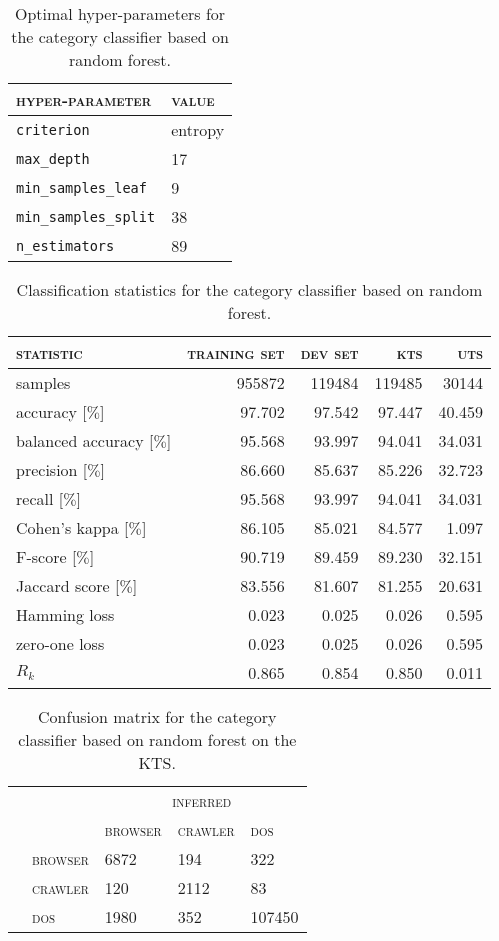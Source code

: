 \begin{table}[H]
	\centering
	\begin{tabular}{ll}
		\toprule
		\textsc{hyper-parameter} & \textsc{value}\\
		\midrule
		\verb|criterion| & entropy\\
		\verb|max_depth| & 17\\
		\verb|min_samples_leaf| & 9\\
		\verb|min_samples_split| & 38\\
		\verb|n_estimators| & 89\\
		\bottomrule
	\end{tabular}
	\caption{Optimal hyper-parameters for the category classifier based on random forest.}
	\label{tab:hyperparameters_category_random_forest}
\end{table}
\begin{table}[H]
	\centering
	\begin{tabular}{lrrrr}
		\toprule
		\textsc{statistic} & \textsc{training set} & \textsc{dev set} & \textsc{kts} & \textsc{uts}\\
		\midrule
		samples & 955872 & 119484 & 119485 & 30144\\
		accuracy [$\%$] & 97.702 & 97.542 & 97.447 & 40.459\\
		balanced accuracy [$\%$] & 95.568 & 93.997 & 94.041 & 34.031\\
		precision [$\%$] & 86.660 & 85.637 & 85.226 & 32.723\\
		recall [$\%$] & 95.568 & 93.997 & 94.041 & 34.031\\
		Cohen’s kappa [$\%$] & 86.105 & 85.021 & 84.577 & 1.097\\
		F-score [$\%$] & 90.719 & 89.459 & 89.230 & 32.151\\
		Jaccard score [$\%$] & 83.556 & 81.607 & 81.255 & 20.631\\
		Hamming loss & 0.023 & 0.025 & 0.026 & 0.595\\
		zero-one loss & 0.023 & 0.025 & 0.026 & 0.595\\
		$R_k$ & 0.865 & 0.854 & 0.850 & 0.011\\
		\bottomrule
	\end{tabular}
	\caption{Classification statistics for the category classifier based on random forest.}
	\label{tab:classification_category_random_forest}
\end{table}
\begin{table}[H]
	\centering
	\begin{tabular}{ll|lll}
	\setlength{\tabcolsep}{2pt}
		 & & \multicolumn{3}{c}{\textsc{inferred}}\\
		 & & \textsc{browser} & \textsc{crawler} & \textsc{dos}\\
		\midrule
		\multirow{3}{*}{\rotatebox{90}{\textsc{target}}} & \textsc{browser} & 6872 & 194 & 322\\
		 & \textsc{crawler} & 120 & 2112 & 83\\
		 & \textsc{dos} & 1980 & 352 & 107450\\
	\end{tabular}
	\caption{Confusion matrix for the category classifier based on random forest on the KTS.}
	\label{tab:confusion_category_random_forest}
\end{table}
